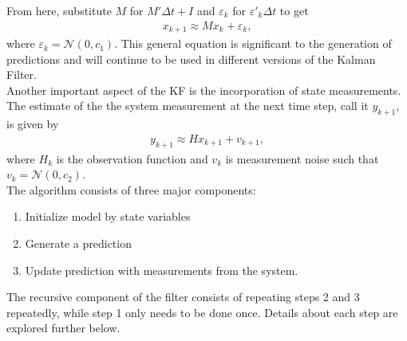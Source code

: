 \noindent From here, substitute $M$ for $M' \Delta t + I$ and $\varepsilon_k$ for  $\varepsilon '_k  \Delta t $ to get
\begin{align*}
	x_{k+1} \approx M x_k + \varepsilon_k,
\end{align*}
\noindent where $\varepsilon_k = \mathcal{N}(0, c_1)$. This general equation is significant to the generation of predictions and will continue to be used in different versions of the Kalman Filter. \\ 

\noindent Another important aspect of the KF is the incorporation of state measurements. The estimate of the the system measurement at the next time step, call it $y_{k+1}$, is given by 
\begin{align*}
	y_{k+1} \approx H x_{k+1} + v_{k+1},
\end{align*}
where $H_k$ is the observation function and $v_k$ is measurement noise such that $v_k = \mathcal{N}(0, c_2)$. \\

\noindent The algorithm consists of three major components:
\begin{enumerate}
  \item Initialize model by state variables
  \item Generate a prediction
  \item Update prediction with measurements from the system.
\end{enumerate}
The recursive component of the filter consists of repeating steps 2 and 3 repeatedly, while step 1 only needs to be done once. Details about each step are explored further below.


